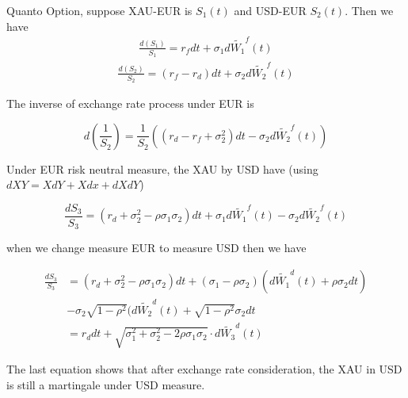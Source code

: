 \begin{exmp}
Quanto Option, suppose XAU-EUR is $S_1(t)$ and USD-EUR $S_2(t)$. Then we have
\begin{equation}
  \begin{aligned}
  \frac{d(S_1)}{S_1} = r_f dt + \sigma_1 d\widetilde{W_1}^f(t)
  \end{aligned}
\end{equation}
\begin{equation}
  \begin{aligned}
  \frac{d(S_2)}{S_2} = (r_f - r_d) dt + \sigma_2 d\widetilde{W_2}^f(t)
  \end{aligned}
\end{equation}

The inverse of exchange rate process under EUR is

\begin{equation}
d(\frac{1}{S_2}) = \frac{1}{S_2} ( (r_d - r_f + \sigma_2^2) dt - \sigma_2 d\widetilde{W_2}^f(t) )
\end{equation}

Under EUR risk neutral measure, the XAU by USD have (using $dXY = XdY + Xdx + dXdY$)

\begin{equation}
\frac{dS_3}{S_3} = (r_d + \sigma_2^2 - \rho\sigma_1\sigma_2) dt  + \sigma_1 d\widetilde{W_1}^f(t) - \sigma_2 d\widetilde{W_2}^f(t)
\end{equation}

when we change measure EUR to measure USD then we have

\begin{equation}
\begin{aligned}
\frac{dS_3}{S_3} &= (r_d + \sigma_2^2 - \rho\sigma_1\sigma_2) dt  + (\sigma_1 - \rho\sigma_2)(d\widetilde{W_1}^d(t) + \rho \sigma_2 dt) \\
                 &- \sigma_2 \sqrt{1 - \rho ^ 2} (d\widetilde{W_2}^d(t) + \sqrt{1 - \rho ^ 2} \sigma_2 dt\\
                 &= r_d dt + \sqrt{\sigma_1^2 + \sigma_2^2 - 2\rho \sigma_1 \sigma_2} \cdot d\widetilde{W_3}^d(t)
\end{aligned}
\end{equation}

The last equation shows that {\color{blue}after exchange rate consideration, the XAU in USD is still a martingale under USD measure.}

\end{exmp}

